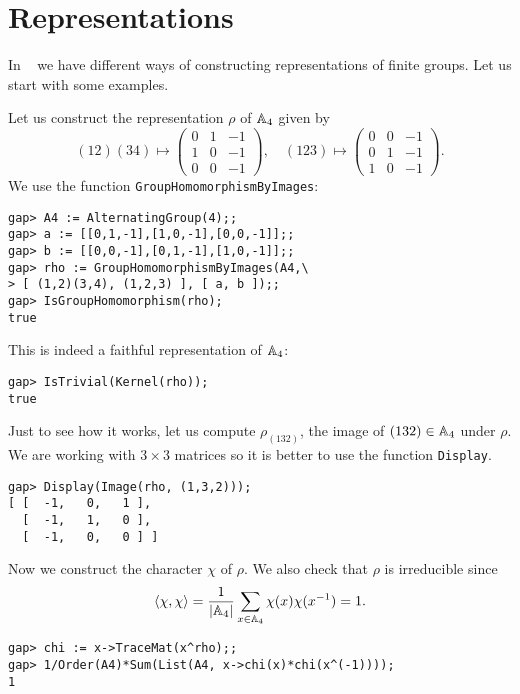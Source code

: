 \section{Representations}

In \GAP~ we have different ways of constructing representations of finite groups.
Let us start with some examples. 

\begin{example}
Let us construct the representation $\rho$ of $\mathbb{A}_4$ given by 
\begin{equation*}
  (12)(34)\mapsto\begin{pmatrix}
    0 & 1 & -1\\
    1 & 0 & -1\\
    0 & 0 & -1
  \end{pmatrix},
  \quad
  (123)\mapsto\begin{pmatrix}
    0 & 0 & -1\\
    0 & 1 & -1\\
    1 & 0 & -1
  \end{pmatrix}.
\end{equation*}
We use the function \lstinline{GroupHomomorphismByImages}: 
\begin{lstlisting}
gap> A4 := AlternatingGroup(4);;
gap> a := [[0,1,-1],[1,0,-1],[0,0,-1]];;
gap> b := [[0,0,-1],[0,1,-1],[1,0,-1]];;
gap> rho := GroupHomomorphismByImages(A4,\
> [ (1,2)(3,4), (1,2,3) ], [ a, b ]);;
gap> IsGroupHomomorphism(rho);
true
\end{lstlisting}
This is indeed a faithful representation of $\mathbb{A}_4$:
\begin{lstlisting}
gap> IsTrivial(Kernel(rho));
true
\end{lstlisting}
Just to see how it works, let us compute $\rho_{(132)}$, the image of
$(132)\in\mathbb{A}_4$ under $\rho$. We are working with $3\times 3$ matrices so it
is better to use the function
\lstinline{Display}.
\begin{lstlisting}
gap> Display(Image(rho, (1,3,2)));                                              
[ [  -1,   0,   1 ],
  [  -1,   1,   0 ],
  [  -1,   0,   0 ] ]
\end{lstlisting}
Now we construct the character $\chi$ of $\rho$. We also check that $\rho$ is
irreducible since 
\[
\langle\chi,\chi\rangle=\frac{1}{|\mathbb{A}_4|}\sum_{x\in\mathbb{A}_4}\chi(x)\chi(x^{-1})=1.
\]
\begin{lstlisting}
gap> chi := x->TraceMat(x^rho);;
gap> 1/Order(A4)*Sum(List(A4, x->chi(x)*chi(x^(-1))));
1
\end{lstlisting}
\end{example}

